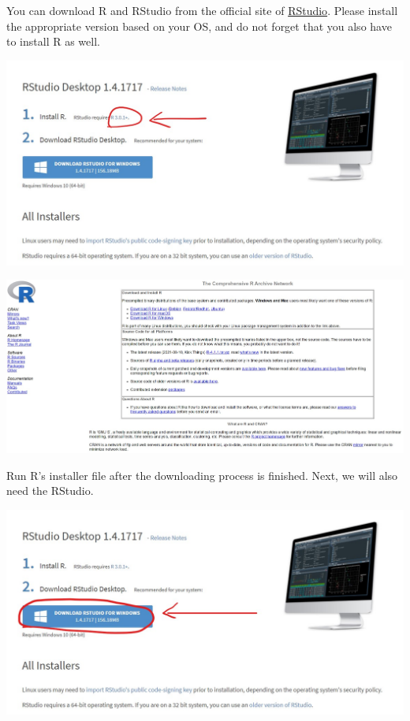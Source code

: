 \documentclass[
]{article}
\begin{document}
You can download R and RStudio from the official site of \href{https://www.rstudio.com/products/rstudio/download/\#download}{RStudio}.
Please install the appropriate version based on your OS, and do not forget that you also have to install R as well.

\href{https://www.rstudio.com/products/rstudio/download/\#download}{\includegraphics[width=6.25in,height=\textheight]{images/installr.jpg}}

\href{https://cran.rstudio.com/}{\includegraphics[width=6.25in,height=\textheight]{images/installr2.jpg}}

Run R's installer file after the downloading process is finished.
Next, we will also need the RStudio.

\href{https://www.rstudio.com/products/rstudio/download/\#download}{\includegraphics[width=6.25in,height=\textheight]{images/installr3.jpg}}
\end{document}
